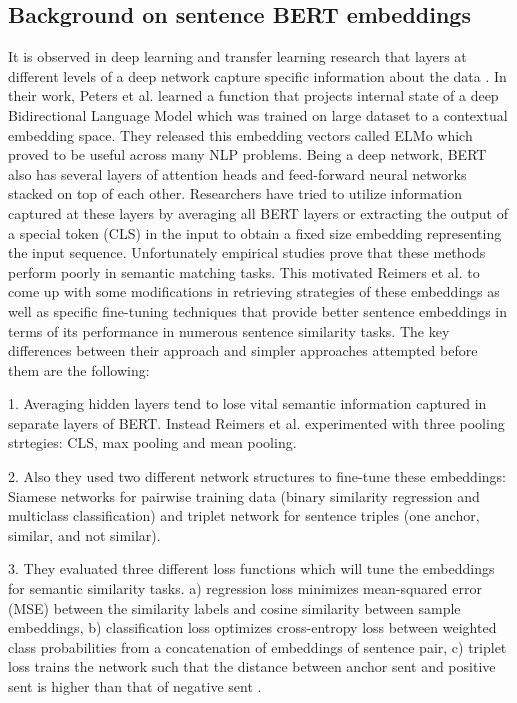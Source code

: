 \subsection{Background on sentence BERT embeddings}
It is observed in deep learning and transfer learning research that layers at different levels of a deep network capture specific information about the data \cite{peters2018dissecting}. In their work, Peters et al. \cite{peters2018deep} learned a function that projects internal state of a deep Bidirectional Language Model which was trained on large dataset to a contextual embedding space. They released this embedding vectors called ELMo which proved to be useful across many NLP problems. Being a deep network, BERT \cite{devlin2018bert} also has several layers of attention heads and feed-forward neural networks stacked on top of each other. Researchers have tried to utilize information captured at these layers by averaging all BERT layers \cite{zhang2019bertscore} or extracting the output of a special token (CLS) in the input \cite{may2019measuring}\cite{qiao2019understanding} to obtain a fixed size embedding representing the input sequence. Unfortunately empirical studies prove that these methods perform poorly in semantic matching tasks. This motivated Reimers et al. \cite{reimers2019sentence} to come up with some modifications in retrieving strategies of these embeddings as well as specific fine-tuning techniques that provide better sentence embeddings in terms of its performance in numerous sentence similarity tasks. The key differences between their approach and simpler approaches attempted before them are the following:

1. Averaging hidden layers tend to lose vital semantic information captured in separate layers of BERT. Instead Reimers et al. experimented with three pooling strtegies: CLS, max pooling and mean pooling. 

2. Also they used two different network structures to fine-tune these embeddings: Siamese networks for pairwise training data (binary similarity regression and multiclass classification) and triplet network for sentence triples (one anchor, similar, and not similar).

3. They evaluated three different loss functions which will tune the embeddings for semantic similarity tasks. a) regression loss minimizes mean-squared error (MSE) between the similarity labels and cosine similarity between sample embeddings, b) classification loss optimizes cross-entropy loss between weighted class probabilities from a concatenation of embeddings of sentence pair, c) triplet loss trains the network such that the distance between anchor sent  and positive sent  is higher than that of negative sent .

